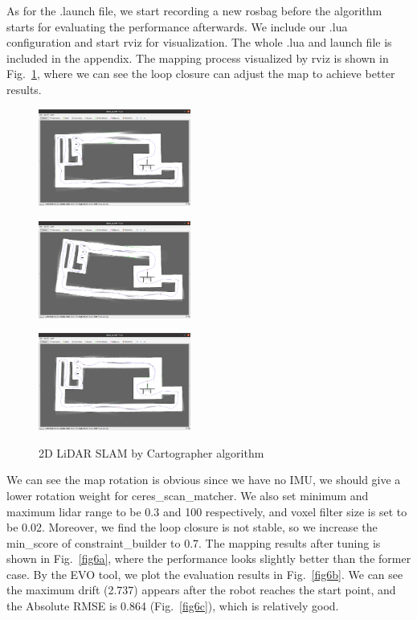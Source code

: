 \documentclass[hyperref]{article}
\theoremstyle{nonumberplain}
\begin{document}
As for the .launch file, we start recording a new rosbag before the algorithm starts for evaluating the performance afterwards. We include our .lua configuration and start rviz for visualization. The whole .lua and launch file is included in the appendix. The mapping process visualized by rviz is shown in Fig.~\ref{fig5}, where we can see the loop closure can adjust the map to achieve better results.


\begin{figure}[H]
	\centering
	\begin{minipage}[t]{0.32\textwidth}
		\centering
		\includegraphics[width=5cm]{task3a_result1.png}
		\label{fig5a}
	\end{minipage}
	\begin{minipage}[t]{0.32\textwidth}
		\centering
		\includegraphics[width=5cm]{task3a_result2.png}
		\label{fig5b}
	\end{minipage}
	\begin{minipage}[t]{0.32\textwidth}
		\centering
		\includegraphics[width=5cm]{task3a_result3.png}
		\label{fig5c}
	\end{minipage}
	\caption{2D LiDAR SLAM by Cartographer algorithm}
	\label{fig5}
\end{figure} 

We can see the map rotation is obvious since we have no IMU, we should give a lower rotation weight for ceres\_scan\_matcher. We also set minimum and maximum lidar range to be 0.3 and 100 respectively, and voxel filter size is set to be 0.02. Moreover, we find the loop closure is not stable, so we increase the min\_score of constraint\_builder to 0.7. The mapping results after tuning is shown in Fig.~\ref{fig6a}, where the performance looks slightly better than the former case. By the EVO tool, we plot the evaluation results in Fig.~\ref{fig6b}. We can see the maximum drift (2.737) appears after the robot reaches the start point, and the Absolute RMSE is 0.864 (Fig.~\ref{fig6c}), which is relatively good. 
\end{document}

